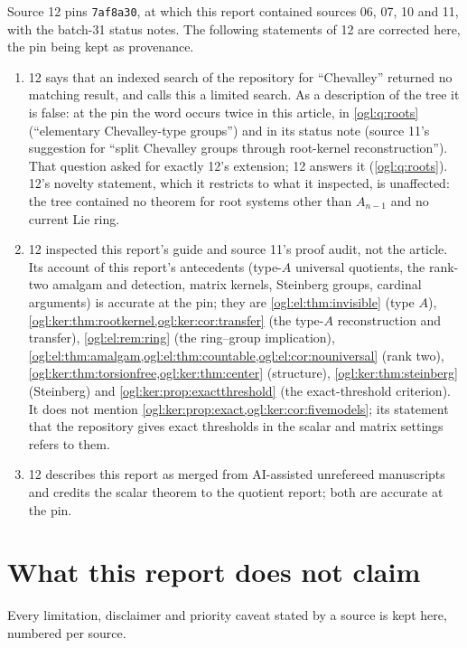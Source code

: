 \documentclass[11pt,oneside]{article}
\numberwithin{equation}{section}
\theoremstyle{definition}
\theoremstyle{remark}
\begin{document}
Source 12 pins \texttt{7af8a30}, at which this report contained sources 06, 07,
10 and 11, with the batch-31 status notes. The following statements of 12 are
corrected here, the pin being kept as provenance.
\begin{enumerate}[leftmargin=*,resume]
\item 12 says that an indexed search of the repository for ``Chevalley''
returned no matching result, and calls this a limited search. As a description
of the tree it is false: at the pin the word occurs twice in this article, in
\cref{ogl:q:roots} (``elementary Chevalley-type groups'') and in its status note
(source 11's suggestion for ``split Chevalley groups through root-kernel
reconstruction''). That question asked for exactly 12's extension; 12 answers
it (\cref{ogl:q:roots}). 12's novelty statement, which it restricts to what it
inspected, is unaffected: the tree contained no theorem for root systems other
than $A_{n-1}$ and no current Lie ring.
\item 12 inspected this report's guide and source 11's proof audit, not the
article. Its account of this report's antecedents (type-$A$ universal
quotients, the rank-two amalgam and detection, matrix kernels, Steinberg groups,
cardinal arguments) is accurate at the pin; they are \cref{ogl:el:thm:invisible} (type $A$),
\cref{ogl:ker:thm:rootkernel,ogl:ker:cor:transfer} (the type-$A$ reconstruction
and transfer), \cref{ogl:el:rem:ring} (the ring--group implication),
\cref{ogl:el:thm:amalgam,ogl:el:thm:countable,ogl:el:cor:nouniversal} (rank two),
\cref{ogl:ker:thm:torsionfree,ogl:ker:thm:center} (structure),
\cref{ogl:ker:thm:steinberg} (Steinberg) and
\cref{ogl:ker:prop:exactthreshold} (the exact-threshold criterion). It does not
mention \cref{ogl:ker:prop:exact,ogl:ker:cor:fivemodels}; its statement that the
repository gives exact thresholds in the scalar and matrix settings refers to
them.
\item 12 describes this report as merged from AI-assisted unrefereed
manuscripts and credits the scalar theorem to the quotient report; both are
accurate at the pin.
\end{enumerate}

\section{What this report does not claim}\label{ogl:app:nonclaims}

Every limitation, disclaimer and priority caveat stated by a source is kept here,
numbered per source.
\end{document}
